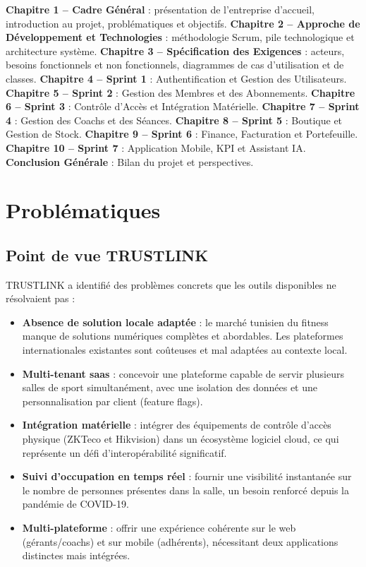 \documentclass[../main.tex]{subfiles}
\begin{document}
\begin{outline}
  \1 \textbf{Chapitre 1 -- Cadre G\'{e}n\'{e}ral} : pr\'{e}sentation de l'entreprise d'accueil, introduction au projet, probl\'{e}matiques et objectifs.
  \1 \textbf{Chapitre 2 -- Approche de D\'{e}veloppement et Technologies} : m\'{e}thodologie Scrum, pile technologique et architecture syst\`{e}me.
  \1 \textbf{Chapitre 3 -- Sp\'{e}cification des Exigences} : acteurs, besoins fonctionnels et non fonctionnels, diagrammes de cas d'utilisation et de classes.
  \1 \textbf{Chapitre 4 -- Sprint 1} : Authentification et Gestion des Utilisateurs.
  \1 \textbf{Chapitre 5 -- Sprint 2} : Gestion des Membres et des Abonnements.
  \1 \textbf{Chapitre 6 -- Sprint 3} : Contr\^{o}le d'Acc\`{e}s et Int\'{e}gration Mat\'{e}rielle.
  \1 \textbf{Chapitre 7 -- Sprint 4} : Gestion des Coachs et des S\'{e}ances.
  \1 \textbf{Chapitre 8 -- Sprint 5} : Boutique et Gestion de Stock.
  \1 \textbf{Chapitre 9 -- Sprint 6} : Finance, Facturation et Portefeuille.
  \1 \textbf{Chapitre 10 -- Sprint 7} : Application Mobile, KPI et Assistant IA.
  \1 \textbf{Conclusion G\'{e}n\'{e}rale} : Bilan du projet et perspectives.
\end{outline}

\section{Probl\'{e}matiques}

\subsection{Point de vue TRUSTLINK}
TRUSTLINK a identifi\'{e} des probl\`{e}mes concrets que les outils disponibles ne r\'{e}solvaient pas :

\begin{itemize}
  \item \textbf{Absence de solution locale adapt\'{e}e} : le march\'{e} tunisien du fitness manque de solutions num\'{e}riques compl\`{e}tes et abordables. Les plateformes internationales existantes sont co\^{u}teuses et mal adapt\'{e}es au contexte local.
  \item \textbf{Multi-tenant \acrshort{saas}} : concevoir une plateforme capable de servir plusieurs salles de sport simultan\'{e}ment, avec une isolation des donn\'{e}es et une personnalisation par client (feature flags).
  \item \textbf{Int\'{e}gration mat\'{e}rielle} : int\'{e}grer des \'{e}quipements de contr\^{o}le d'acc\`{e}s physique (ZKTeco et Hikvision) dans un \'{e}cosyst\`{e}me logiciel cloud, ce qui repr\'{e}sente un d\'{e}fi d'interop\'{e}rabilit\'{e} significatif.
  \item \textbf{Suivi d'occupation en temps r\'{e}el} : fournir une visibilit\'{e} instantan\'{e}e sur le nombre de personnes pr\'{e}sentes dans la salle, un besoin renforc\'{e} depuis la pand\'{e}mie de COVID-19.
  \item \textbf{Multi-plateforme} : offrir une exp\'{e}rience coh\'{e}rente sur le web (g\'{e}rants/coachs) et sur mobile (adh\'{e}rents), n\'{e}cessitant deux applications distinctes mais int\'{e}gr\'{e}es.
\end{itemize}
\end{document}
